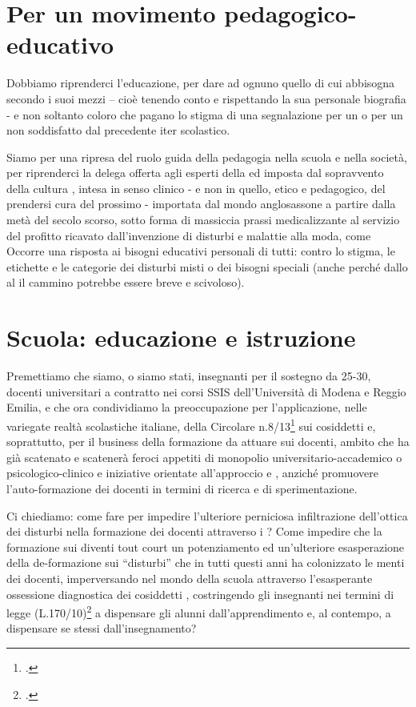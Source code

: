 \section*{Per un movimento pedagogico-educativo}

Dobbiamo riprenderci l'educazione, per dare ad ognuno quello di cui abbisogna secondo i suoi mezzi – cioè tenendo conto e rispettando la sua personale biografia - e non  soltanto coloro che pagano lo stigma di una segnalazione per  un  o per  un   non soddisfatto dal precedente iter scolastico.

Siamo per una ripresa del ruolo guida della pedagogia nella scuola e nella società, per riprenderci la delega offerta agli  esperti  della   ed imposta dal sopravvento della cultura , intesa in senso clinico - e non in quello, etico e pedagogico, del prendersi cura del prossimo - importata dal mondo anglosassone a partire dalla metà del secolo scorso, sotto forma di massiccia prassi medicalizzante al servizio del profitto ricavato dall'invenzione di disturbi e malattie  alla moda, come  Occorre una risposta ai bisogni educativi personali di tutti: contro lo  stigma, le etichette e le categorie dei disturbi misti o dei bisogni speciali (anche  perché dallo  al  il cammino potrebbe essere  breve e scivoloso). 
\section*{Scuola: educazione e istruzione}

Premettiamo che siamo, o siamo stati, insegnanti per il  sostegno da 25-30, docenti universitari a contratto nei corsi SSIS dell'Università di Modena e Reggio Emilia, e che ora condividiamo la preoccupazione per l'applicazione, nelle variegate realtà scolastiche italiane, della Circolare n.8/13\footcite{cm8_2013} sui cosiddetti  e, soprattutto, per il business della formazione da attuare sui docenti, ambito che ha già scatenato e scatenerà feroci appetiti di monopolio universitario-accademico o psicologico-clinico e iniziative orientate all'approccio  e , anziché promuovere l'auto-formazione dei docenti in termini di ricerca e di sperimentazione.

Ci chiediamo: come fare per impedire l'ulteriore perniciosa infiltrazione dell'ottica dei disturbi nella formazione dei docenti attraverso  i ? Come impedire che la formazione sui  diventi tout court un potenziamento ed un'ulteriore esasperazione della de-formazione sui “disturbi” che in tutti questi anni ha colonizzato le menti dei docenti, imperversando nel mondo della scuola attraverso l'esasperante ossessione diagnostica dei cosiddetti , costringendo gli insegnanti nei termini di legge (L.170/10)\footcite{legge170} a dispensare gli alunni dall'apprendimento e, al contempo,  a dispensare se stessi dall'insegnamento?  

